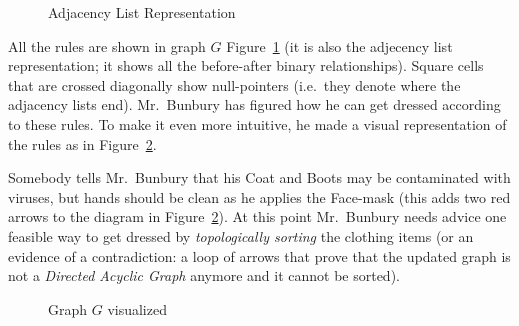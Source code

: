 \documentclass[a4paper,12pt]{article}
\begin{document}
\begin{figure}[!htb]
\caption{\label{fig:clothing-adjacent} Adjacency List Representation}
\end{figure}

All the rules are shown in graph $G$ Figure~\ref{fig:clothing-adjacent}
(it is also the adjecency list representation; 
it shows all the before-after binary relationships). Square cells
that are crossed diagonally show null-pointers (i.e.\ they denote 
where the adjacency lists end). 
Mr.\ Bunbury has figured how he can get dressed according to these rules.
To make it even more intuitive, he made a visual 
representation of the rules as in Figure~\ref{fig:clothing-dag}.

Somebody tells Mr.\ Bunbury that his Coat and Boots may be contaminated 
with viruses, but hands should be clean as he applies the Face-mask 
(this adds two red arrows to the diagram in Figure~\ref{fig:clothing-dag}).
At this point Mr.\ Bunbury needs advice \textendash{} one 
feasible way to get dressed 
by {\em topologically sorting} the clothing items
(or an evidence of a contradiction: a loop of arrows that prove 
that the updated graph is not a 
{\em Directed Acyclic Graph} anymore and it cannot be sorted).

\begin{figure}[!htb]
\caption{\label{fig:clothing-dag} Graph $G$ visualized}
\end{figure}
\end{document}
